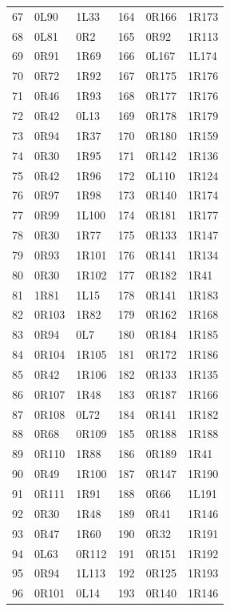 {\begin{longtable}{@{}rll@{\hspace{32pt}}rll@{}}
67&0L90&1L33&164&0R166&1R173\\
68&0L81&0R2&165&0R92&1R113\\
69&0R91&1R69&166&0L167&1L174\\
70&0R72&1R92&167&0R175&1R176\\
71&0R46&1R93&168&0R177&1R176\\
72&0R42&0L13&169&0R178&1R179\\
73&0R94&1R37&170&0R180&1R159\\
74&0R30&1R95&171&0R142&1R136\\
75&0R42&1R96&172&0L110&1R124\\
76&0R97&1R98&173&0R140&1R174\\
77&0R99&1L100&174&0R181&1R177\\
78&0R30&1R77&175&0R133&1R147\\
79&0R93&1R101&176&0R141&1R134\\
80&0R30&1R102&177&0R182&1R41\\
81&1R81&1L15&178&0R141&1R183\\
82&0R103&1R82&179&0R162&1R168\\
83&0R94&0L7&180&0R184&1R185\\
84&0R104&1R105&181&0R172&1R186\\
85&0R42&1R106&182&0R133&1R135\\
86&0R107&1R48&183&0R187&1R166\\
87&0R108&0L72&184&0R141&1R182\\
88&0R68&0R109&185&0R188&1R188\\
89&0R110&1R88&186&0R189&1R41\\
90&0R49&1R100&187&0R147&1R190\\
91&0R111&1R91&188&0R66&1L191\\
92&0R30&1R48&189&0R41&1R146\\
93&0R47&1R60&190&0R32&1R191\\
94&0L63&0R112&191&0R151&1R192\\
95&0R94&1L113&192&0R125&1R193\\
96&0R101&0L14&193&0R140&1R146\\
\end{longtable}
}
